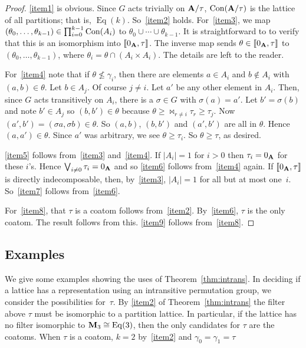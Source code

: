 \begin{proof}
\eqref{item1} is obvious. Since $G$ acts trivially on $\mathbf{A}/\tau$,
$\operatorname{Con} (\mathbf{A}/\tau)$ is the lattice of all partitions; that is, 
$\operatorname{Eq}(k)$. So~\eqref{item2} holds. For~\eqref{item3},
we map
$(\theta_0, \ldots, \theta_{k-1}) \in \prod_{i=0}^{k-1} \operatorname{Con}(A_i)$
to $\theta_0 \cup \cdots \cup \theta_{k-1}$. It is straightforward to
to verify that this is an isomorphism into $\llbracket 0_{\mathbf{A}},\tau\rrbracket$. The inverse
map sends $\theta \in \llbracket 0_{\mathbf{A}},\tau\rrbracket$ to $(\theta_0, \ldots, \theta_{k-1})$,
where $\theta_i = \theta \cap (A_i \times A_i)$. The details are left to the reader.

For~\eqref{item4} note that if 
$\theta \not\le \gamma_i$, then
there are elements $a \in A_i$ and $b \notin A_i$ with
$(a,b) \in \theta$. Let $b \in A_j$. Of course $j \ne i$.
Let $a'$ be any other element in $A_i$. Then,
since $G$ acts transitively on $A_i$,
there is a  $\sigma \in G$ with $\sigma(a)  = a'$. Let $b' = \sigma(b)$
and note $b' \in A_j$ so $(b,b') \in \theta$ because $\theta \ge
\Join_{r\ne i} \tau_r \ge \tau_j$.
Now
$(a',b') = (\sigma a,\sigma b) \in \theta.$
So $(a,b)$, $(b,b')$ and $(a',b')$ are all in $\theta$. Hence
$(a,a') \in \theta$. Since $a'$ was arbitrary, we see
$\theta \ge \tau_i$. So $\theta \ge \tau$, as desired.

\eqref{item5} follows from~\eqref{item3} and~\eqref{item4}. If
$|A_i| = 1$ for $i> 0$ then $\tau_i = 0_{\mathbf{A}}$ for these $i$'s. Hence
$\bigvee_{i\ne 0} \tau_i = 0_{\mathbf{A}}$ and so \eqref{item6} follows
from~\eqref{item4} again. If $\llbracket 0_{\mathbf{A}},\tau\rrbracket$ is directly indecomposable, then,
by~\eqref{item3}, $|A_i| = 1$ for all but at most one~$i$. So~\eqref{item7}
follows from~\eqref{item6}.

For~\eqref{item8}, that $\tau$ is a coatom follows from~\eqref{item2}. 
By~\eqref{item6}, $\tau$ is the only coatom. The result follows from this.
\eqref{item9} follows from~\eqref{item8}.
\end{proof}

\subsection{Examples}

We give some examples showing the uses of Theorem~\ref{thm:intrans}. 
In deciding if a lattice has a representation using an intransitive
permutation group, we consider the possibilities for~$\tau$. 
By \eqref{item2} of Theorem~\ref{thm:intrans} the filter above
$\tau$ must be isomorphic to a partition lattice. In particular,
if the lattice has no filter isomorphic to $\mathbf{M}_3 \cong \operatorname{Eq}(3)$, then the 
only candidates for $\tau$ are the coatoms. When $\tau$ is a coatom, $k = 2$
by~\eqref{item2} and $\gamma_0 = \gamma_1 = \tau$

